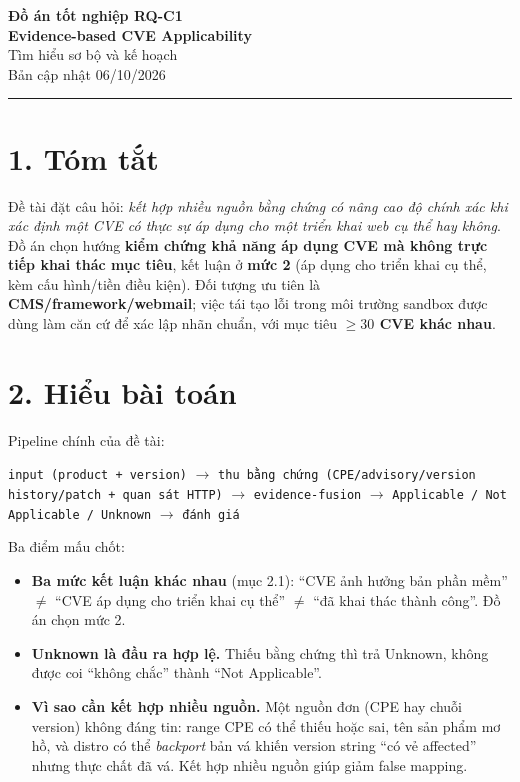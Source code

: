 \documentclass[11pt,a4paper]{article}
\begin{document}
\begin{center}
  {\LARGE\bfseries Đồ án tốt nghiệp RQ-C1}\\[2mm]
  {\large\bfseries Evidence-based CVE Applicability}\\[4mm]
  {\large Tìm hiểu sơ bộ và kế hoạch}\\[2mm]
  {\normalsize Bản cập nhật 06/10/2026}
\end{center}

\vspace{1mm}
\hrule
\vspace{4mm}

\section*{1. Tóm tắt}

Đề tài đặt câu hỏi: \emph{kết hợp nhiều nguồn bằng chứng có nâng cao độ chính xác khi xác định một CVE có thực sự áp dụng cho một triển khai web cụ thể hay không}. Đồ án chọn hướng \textbf{kiểm chứng khả năng áp dụng CVE mà không trực tiếp khai thác mục tiêu}, kết luận ở \textbf{mức 2} (áp dụng cho triển khai cụ thể, kèm cấu hình/tiền điều kiện). Đối tượng ưu tiên là \textbf{CMS/framework/webmail}; việc tái tạo lỗi trong môi trường sandbox được dùng làm căn cứ để xác lập nhãn chuẩn, với mục tiêu \textbf{$\ge 30$ CVE khác nhau}.

\section*{2. Hiểu bài toán}

Pipeline chính của đề tài:

\begin{center}
\texttt{input (product + version)} $\rightarrow$ \texttt{thu bằng chứng (CPE/advisory/version history/patch + quan sát HTTP)} $\rightarrow$ \texttt{evidence-fusion} $\rightarrow$ \texttt{Applicable / Not Applicable / Unknown} $\rightarrow$ \texttt{đánh giá}
\end{center}

Ba điểm mấu chốt:

\begin{itemize}
  \item \textbf{Ba mức kết luận khác nhau} (mục 2.1): ``CVE ảnh hưởng bản phần mềm'' $\neq$ ``CVE áp dụng cho triển khai cụ thể'' $\neq$ ``đã khai thác thành công''. Đồ án chọn mức 2.
  \item \textbf{Unknown là đầu ra hợp lệ.} Thiếu bằng chứng thì trả Unknown, không được coi ``không chắc'' thành ``Not Applicable''.
  \item \textbf{Vì sao cần kết hợp nhiều nguồn.} Một nguồn đơn (CPE hay chuỗi version) không đáng tin: range CPE có thể thiếu hoặc sai, tên sản phẩm mơ hồ, và distro có thể \emph{backport} bản vá khiến version string ``có vẻ affected'' nhưng thực chất đã vá. Kết hợp nhiều nguồn giúp giảm false mapping.
\end{itemize}
\end{document}
